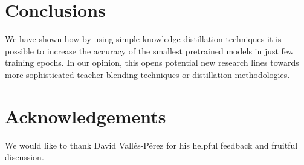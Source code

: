 \documentclass{elsarticle}
\begin{document}
	\section{Conclusions}
	We have shown how by using simple knowledge distillation techniques it is possible to increase the accuracy of the smallest pretrained models in just few training epochs. In our opinion, this opens potential new research lines towards more sophisticated teacher blending techniques or distillation methodologies.
	
	
	\section{Acknowledgements}
	We would like to thank David Vallés-Pérez for his helpful feedback and fruitful discussion.
	\newpage
	
	
	
	
\end{document}

